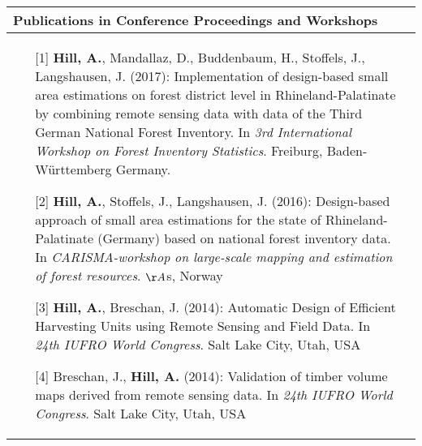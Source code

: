 
\noindent
\begin{tabular*}{\textwidth}{p{}p{}}
	\multicolumn{2}{l}{\large Publications in Conference Proceedings and Workshops}\\
	\toprule
	
	\begin{enumerate}[]	
		
		\item [{[1]}] \textbf{Hill, A.}, Mandallaz, D., Buddenbaum, H., Stoffels, J., Langshausen, J. (2017): Implementation of design-based small area estimations on forest district level in Rhineland-Palatinate by combining remote sensing data with data of the Third German National Forest Inventory. In \textit{3rd International Workshop on Forest Inventory Statistics}. Freiburg, Baden-W{\"u}rttemberg Germany.
		
		\item [{[2]}] \textbf{Hill, A.}, Stoffels, J., Langshausen, J. (2016): Design-based approach of small area estimations for the state of Rhineland-Palatinate (Germany) based on national forest inventory data. In \textit{CARISMA-workshop on large-scale mapping and estimation of forest resources}. $\AA$s, Norway
		
		\item [{[3]}] \textbf{Hill, A.}, Breschan, J. (2014): Automatic Design of Efficient Harvesting Units using Remote Sensing and Field Data. In \textit{24th IUFRO World Congress}. Salt Lake City, Utah, USA
		
		\item [{[4]}] Breschan, J., \textbf{Hill, A.} (2014): Validation of timber volume maps derived from remote sensing data. In \textit{24th IUFRO World Congress}. Salt Lake City, Utah, USA
		
	\end{enumerate}	
&\\
\end{tabular*}


